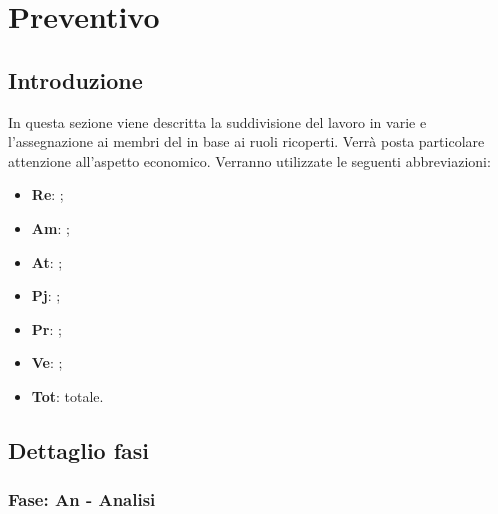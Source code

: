 \section {Preventivo}
	\subsection {Introduzione}
    In questa sezione viene descritta la suddivisione del lavoro in varie  e l'assegnazione ai membri del  in base ai ruoli ricoperti. Verrà posta particolare attenzione all'aspetto economico.
    Verranno utilizzate le seguenti abbreviazioni:
   		\begin{itemize}
   		\item{\textbf{Re}}: \responsabilediprogetto;
     	\item{\textbf{Am}}: \amministratore;
     	\item{\textbf{At}}: \analista;
     	\item{\textbf{Pj}}: \progettista;
     	\item{\textbf{Pr}}: \programmatore;
     	\item{\textbf{Ve}}: \verificatore;
     	\item{\textbf{Tot}}: totale.
   		\end{itemize}


	\subsection {Dettaglio fasi}
		\subsubsection {Fase: An - Analisi}
